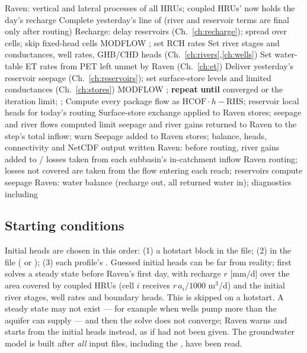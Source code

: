 \begin{algorithm}[h]\caption{One coupled time step}\label{alg:step}
\begin{algorithmic}[1]
\State Raven: vertical and lateral processes of all HRUs; coupled HRUs'  now holds the day's recharge
\State Complete yesterday's line of  (river and reservoir terms are final only after routing)
\State Recharge: delay reservoirs (Ch.~\ref{ch:recharge}); spread over cells; skip fixed-head cells
\State MODFLOW ; set RCH rates
\State Set river stages and conductances, well rates, GHB/CHD heads (Ch.~\ref{ch:rivers},\ref{ch:wells})
\State Set water-table ET rates from PET left unmet by Raven (Ch.~\ref{ch:et})
\State Deliver yesterday's reservoir seepage (Ch.~\ref{ch:reservoirs}); set surface-store levels and limited conductances (Ch.~\ref{ch:stores})
\State MODFLOW ; \textbf{repeat}  \textbf{until} converged or the iteration limit; ; 
\State Compute every package flow as $\mathrm{HCOF}\cdot h-\mathrm{RHS}$; reservoir local heads for today's routing
\State Surface-store exchange applied to Raven stores; seepage and river flows computed
 limit seepage and river gains returned to Raven to the step's total inflow; warn \EndIf
\State Seepage added to Raven stores; balance, heads, connectivity and NetCDF output written
\State Raven: before routing, river gains added to / losses taken from each subbasin's in-catchment inflow
\State Raven routing; losses not covered are taken from the flow entering each reach; reservoirs compute seepage
\State Raven: water balance (recharge out, all returned water in); diagnostics including 
\end{algorithmic}
\end{algorithm}

\subsection{Starting conditions}\label{sec:init}
Initial heads are chosen in this order: (1) a hotstart block  in the  file; (2)
 in the  file ( or ); (3) each profile's
. Guessed initial heads can be far from reality; 
first solves a steady state before Raven's first day, with recharge $r$ [mm/d] over the area covered by coupled HRUs
(cell $i$ receives $r\,a_i/1000$ m$^3$/d) and the initial river stages, well rates and boundary heads. This is skipped on a hotstart. A steady state may not
exist --- for example when wells pump more than the aquifer can supply --- and then the solve does not converge; Raven
warns and starts from the initial heads instead, as if  had not been given. The groundwater model is built after \emph{all} input files,
including the , have been read.

